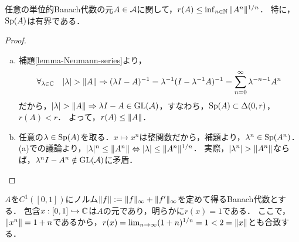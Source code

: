 \documentclass[uplatex,dvipdfmx]{jsreport}
\begin{document}
\begin{lemma}[Beurling]
    任意の単位的Banach代数の元$A\in\mathcal{A}$に関して，$r(A)\le\inf_{n\in\mathbb{N}}\|A^n\|^{1/n}$．
    特に，$\mathrm{Sp}(A)$は有界である．
\end{lemma}
\begin{proof}\mbox{}
    \begin{enumerate}[(a)]
        \item 補題\ref{lemma-Neumann-series}より，
        \[\forall_{\lambda\in\mathbb{C}}\quad\lvert\lambda\rvert>\|A\|\Rightarrow(\lambda I-A)^{-1}=\lambda^{-1}(I-\lambda^{-1}A)^{-1}=\sum^\infty_{n=0}\lambda^{-n-1}A^n\]
        だから，$\lvert\lambda\rvert>\|A\|\Rightarrow\lambda I-A\in\mathrm{GL}(\mathcal{A})$，すなわち，$\mathrm{Sp}(A)\subset\Delta(0,r)$，$r(A)<r$．
        よって，$r(A)\le\|A\|$．
        \item 任意の$\lambda\in\mathrm{Sp}(A)$を取る．$x\mapsto x^n$は整関数だから，補題より，$\lambda^n\in\mathrm{Sp}(A^n)$．(a)での議論より，$\lvert\lambda\rvert^n\le\|A^n\|\Leftrightarrow\lvert\lambda\rvert\le\|A^n\|^{1/n}$．
        実際，$\lvert\lambda^n\rvert>\|A^n\|$ならば，$\lambda^nI-A^n\notin\mathrm{GL}(\mathcal{A})$に矛盾．
    \end{enumerate}
\end{proof}
\begin{example}
    $A$を$C^1([0,1])$にノルム$\|f\|:=\|f\|_\infty+\|f'\|_\infty$を定めて得るBanach代数とする．
    包含$x:[0,1]\hookrightarrow\mathbb{C}$は$A$の元であり，明らかに$r(x)=1$である．
    ここで，$\|x^n\|=1+n$であるから，$r(x)=\lim_{n\to\infty}(1+n)^{1/n}=1<2=\|x\|$とも合致する．
\end{example}
\end{document}
